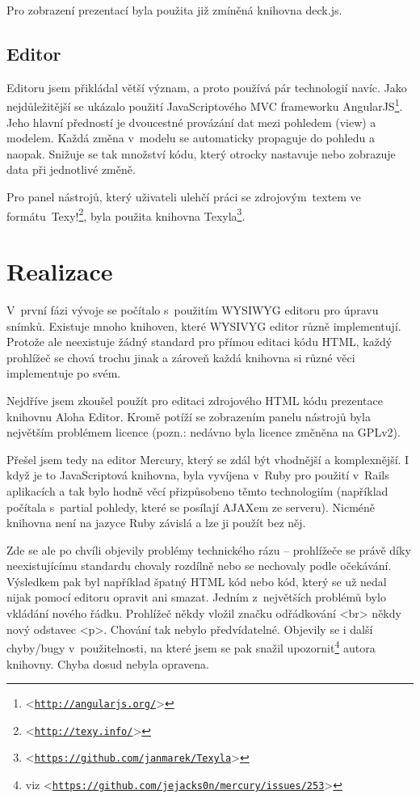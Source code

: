 \documentclass[11pt,twoside,a4paper]{book}
\let\oldUrl\url									%
\renewcommand\url[1]{<\texttt{\oldUrl{#1}}>}
\begin{document}
Pro zobrazení prezentací byla použita již zmíněná knihovna deck.js.


\section{Editor}
Editoru jsem přikládal větší význam, a proto používá pár technologií navíc. Jako nejdůležitější se ukázalo použití JavaScriptového MVC frameworku AngularJS\footnote{\url{http://angularjs.org/}}. Jeho hlavní předností je dvoucestné provázání dat mezi pohledem (view) a modelem. Každá změna v~modelu se automaticky propaguje do pohledu a naopak. Snižuje se tak množství kódu, který otrocky nastavuje nebo zobrazuje data při jednotlivé změně.

Pro panel nástrojů, který uživateli ulehčí práci se zdrojovým~textem ve formátu~Texy!\footnote{\url{http://texy.info/}}, byla použita knihovna Texyla\footnote{\url{https://github.com/janmarek/Texyla}}.



\chapter{Realizace} \label{chap:realizace}
V~první fázi vývoje se počítalo s~použitím WYSIWYG editoru pro úpravu snímků. Existuje mnoho knihoven, které WYSIVYG
editor různě implementují. Protože ale neexistuje žádný standard pro přímou editaci kódu HTML, každý prohlížeč se chová
trochu jinak a zároveň každá knihovna si různé věci implementuje po svém.

Nejdříve jsem zkoušel použít pro editaci zdrojového HTML kódu prezentace knihovnu Aloha Editor. Kromě potíží se
zobrazením panelu nástrojů byla největším problémem licence (pozn.: nedávno byla licence změněna na GPLv2).

Přešel jsem tedy na editor Mercury, který se zdál být vhodnější a komplexnější. I když je to JavaScriptová knihovna,
byla vyvíjena v~Ruby pro použití v~Rails aplikacích a tak bylo hodně věcí přizpůsobeno těmto technologiím (například
počítala s~partial pohledy, které se posílají AJAXem ze serveru). Nicméně knihovna není na jazyce Ruby závislá a lze ji
použít bez něj.

Zde se ale po chvíli objevily problémy technického rázu – prohlížeče se právě díky neexistujícímu
standardu chovaly rozdílně nebo se nechovaly podle očekávání. Výsledkem pak byl například špatný HTML kód nebo kód,
který se už nedal nijak pomocí editoru opravit ani smazat. Jedním z~největších problémů bylo vkládání nového řádku.
Prohlížeč někdy vložil značku odřádkování {\textless}br{\textgreater} někdy nový odstavec {\textless}p{\textgreater}.
Chování tak nebylo předvídatelné. Objevily se i další chyby/bugy v~použitelnosti, na které jsem se pak snažil
upozornit\footnote{viz \url{https://github.com/jejacks0n/mercury/issues/253}} autora knihovny. Chyba dosud nebyla opravena.
\end{document}
